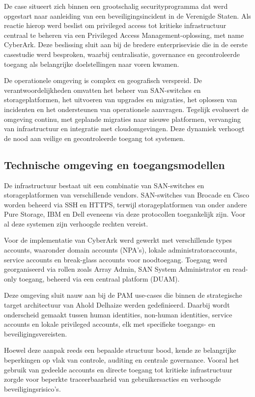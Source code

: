De case situeert zich binnen een grootschalig securityprogramma dat werd opgestart naar aanleiding van een beveiligingsincident in de Verenigde Staten. Als reactie hierop werd beslist om privileged access tot kritieke infrastructuur centraal te beheren via een Privileged Access Management-oplossing, met name CyberArk. Deze beslissing sluit aan bij de bredere enterprisevisie die in de eerste casestudie werd besproken, waarbij centralisatie, governance en gecontroleerde toegang als belangrijke doelstellingen naar voren kwamen. 

De operationele omgeving is complex en geografisch verspreid. De verantwoordelijkheden omvatten het beheer van SAN-switches en storageplatformen, het uitvoeren van upgrades en migraties, het oplossen van incidenten en het ondersteunen van operationele aanvragen. Tegelijk evolueert de omgeving continu, met geplande migraties naar nieuwe platformen, vervanging van infrastructuur en integratie met cloudomgevingen. Deze dynamiek verhoogt de nood aan veilige en gecontroleerde toegang tot systemen. 


\subsection{Technische omgeving en toegangsmodellen}
De infrastructuur bestaat uit een combinatie van SAN-switches en storageplatformen van verschillende vendors. SAN-switches van Brocade en Cisco worden beheerd via SSH en HTTPS, terwijl storageplatformen van onder andere Pure Storage, IBM en Dell eveneens via deze protocollen toegankelijk zijn. Voor al deze systemen zijn verhoogde rechten vereist.
 
Voor de implementatie van CyberArk werd gewerkt met verschillende types accounts, waaronder domain accounts (NPA’s), lokale administratoraccounts, service accounts en break-glass accounts voor noodtoegang. Toegang werd georganiseerd via rollen zoals Array Admin, SAN System Administrator en read-only toegang, beheerd via een centraal platform (DUAM).
 
Deze omgeving sluit nauw aan bij de PAM use-cases die binnen de strategische target architectuur van Ahold Delhaize werden gedefinieerd. Daarbij wordt onderscheid gemaakt tussen human identities, non-human identities, service accounts en lokale privileged accounts, elk met specifieke toegangs- en beveiligingsvereisten. 

Hoewel deze aanpak reeds een bepaalde structuur bood, kende ze belangrijke beperkingen op vlak van controle, auditing en centrale governance. Vooral het gebruik van gedeelde accounts en directe toegang tot kritieke infrastructuur zorgde voor beperkte traceerbaarheid van gebruikersacties en verhoogde beveiligingsrisico’s. 

